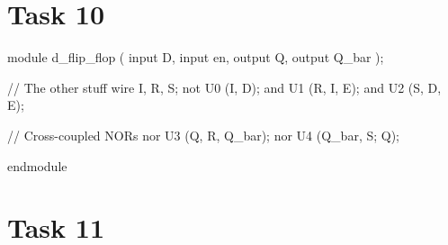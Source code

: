\documentclass[a4paper,11pt,norsk]{article}
\begin{document}
\section*{Task 10}
\begin{codebox}[verilog]
module d_flip_flop (
    input D,
    input en,
    output Q,
    output Q_bar
);

    // The other stuff
    wire I, R, S;
    not U0 (I, D);
    and U1 (R, I, E);
    and U2 (S, D, E);

    // Cross-coupled NORs
    nor U3 (Q, R, Q_bar);
    nor U4 (Q_bar, S; Q);

endmodule
\end{codebox}

\section*{Task 11}
\end{document}
